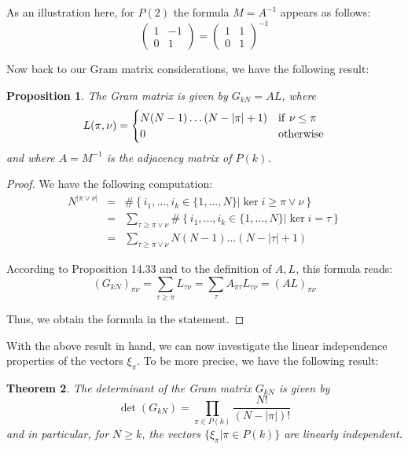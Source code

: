 \documentclass[12pt]{amsbook}
\newtheorem{theorem}{Theorem}[chapter]
\newtheorem{proposition}[theorem]{Proposition}
\begin{document}
As an illustration here, for $P(2)$ the formula $M=A^{-1}$ appears as follows:
$$\begin{pmatrix}1&-1\\ 0&1\end{pmatrix}=
\begin{pmatrix}1&1\\ 0&1\end{pmatrix}^{-1}$$

Now back to our Gram matrix considerations, we have the following result:


\begin{proposition}
The Gram matrix is given by $G_{kN}=AL$, where
$$L(\pi,\nu)=
\begin{cases}
N(N-1)\ldots(N-|\pi|+1)&{\rm if}\ \nu\leq\pi\\
0&{\rm otherwise}
\end{cases}$$
and where $A=M^{-1}$ is the adjacency matrix of $P(k)$.
\end{proposition}

\begin{proof}
We have the following computation:
\begin{eqnarray*}
N^{|\pi\vee\nu|}
&=&\#\left\{i_1,\ldots,i_k\in\{1,\ldots,N\}\Big|\ker i\geq\pi\vee\nu\right\}\\
&=&\sum_{\tau\geq\pi\vee\nu}\#\left\{i_1,\ldots,i_k\in\{1,\ldots,N\}\Big|\ker i=\tau\right\}\\
&=&\sum_{\tau\geq\pi\vee\nu}N(N-1)\ldots(N-|\tau|+1)
\end{eqnarray*}

According to Proposition 14.33 and to the definition of $A,L$, this formula reads:
$$(G_{kN})_{\pi\nu}
=\sum_{\tau\geq\pi}L_{\tau\nu}
=\sum_\tau A_{\pi\tau}L_{\tau\nu}
=(AL)_{\pi\nu}$$

Thus, we obtain the formula in the statement.
\end{proof}

With the above result in hand, we can now investigate the linear independence properties of the vectors $\xi_\pi$. To be more precise, we have the following result:


\begin{theorem}
The determinant of the Gram matrix $G_{kN}$ is given by
$$\det(G_{kN})=\prod_{\pi\in P(k)}\frac{N!}{(N-|\pi|)!}$$
and in particular, for $N\geq k$, the vectors $\{\xi_\pi|\pi\in P(k)\}$ are linearly independent.
\end{theorem}
\end{document}
